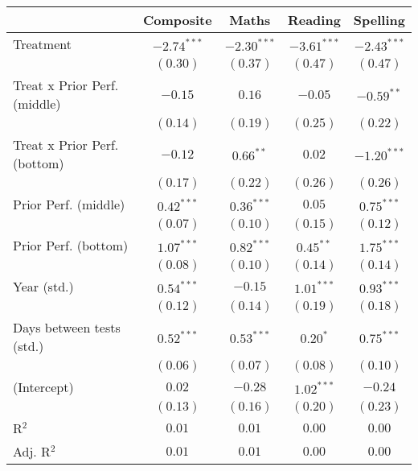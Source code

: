 
\begin{table}
\begin{center}
\begin{tabular}{l c c c c}
\hline
 & Composite & Maths & Reading & Spelling \\
\hline
Treatment                    & $-2.74^{***}$ & $-2.30^{***}$ & $-3.61^{***}$ & $-2.43^{***}$ \\
                             & $(0.30)$      & $(0.37)$      & $(0.47)$      & $(0.47)$      \\
Treat x Prior Perf. (middle) & $-0.15$       & $0.16$        & $-0.05$       & $-0.59^{**}$  \\
                             & $(0.14)$      & $(0.19)$      & $(0.25)$      & $(0.22)$      \\
Treat x Prior Perf. (bottom) & $-0.12$       & $0.66^{**}$   & $0.02$        & $-1.20^{***}$ \\
                             & $(0.17)$      & $(0.22)$      & $(0.26)$      & $(0.26)$      \\
Prior Perf. (middle)         & $0.42^{***}$  & $0.36^{***}$  & $0.05$        & $0.75^{***}$  \\
                             & $(0.07)$      & $(0.10)$      & $(0.15)$      & $(0.12)$      \\
Prior Perf. (bottom)         & $1.07^{***}$  & $0.82^{***}$  & $0.45^{**}$   & $1.75^{***}$  \\
                             & $(0.08)$      & $(0.10)$      & $(0.14)$      & $(0.14)$      \\
Year (std.)                  & $0.54^{***}$  & $-0.15$       & $1.01^{***}$  & $0.93^{***}$  \\
                             & $(0.12)$      & $(0.14)$      & $(0.19)$      & $(0.18)$      \\
Days between tests (std.)    & $0.52^{***}$  & $0.53^{***}$  & $0.20^{*}$    & $0.75^{***}$  \\
                             & $(0.06)$      & $(0.07)$      & $(0.08)$      & $(0.10)$      \\
(Intercept)                  & $0.02$        & $-0.28$       & $1.02^{***}$  & $-0.24$       \\
                             & $(0.13)$      & $(0.16)$      & $(0.20)$      & $(0.23)$      \\
\hline
R$^2$                        & $0.01$        & $0.01$        & $0.00$        & $0.00$        \\
Adj. R$^2$                   & $0.01$        & $0.01$        & $0.00$        & $0.00$        \\

\end{tabular}
\end{center}
\end{table}
